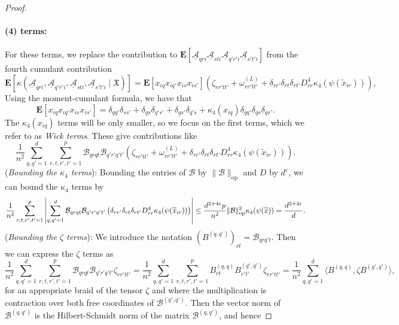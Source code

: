 \documentclass[letterpaper, 10pt, dvipsnames]{article}
\numberwithin{equation}{section}
\newcommand{\Au}{\underline{\mathcal{A}}}
\newcommand{\B}{\mathcal{B}}
\newcommand{\wt}{\widetilde}
\let\O\relax
\newcommand{\O}[1]{\mathcal{O}\left(#1\right)}
\newcommand{\Eb}{\mathbf{E}}
\theoremstyle{definition}
\begin{document}
\begin{proof}
  \paragraph{(4) terms:}  
  For these terms, we replace the contribution to $\Eb\left[
    \Au_{qri}\Au_{sti}\Au_{q'r'i}\Au_{s't'i}
    \right]$
  from the fourth cumulant contribution 
    \[
    \Eb\left[\kappa( \Au_{qri},\Au_{q'r'i},\Au_{sti},\Au_{s't'i} \mid \mathfrak{X})\right]
    = \Eb\left[x_{iq}x_{iq'}x_{is}x_{is'}\right] 
    \left( 
      \zeta_{rr'tt'} 
      + \omega^{(L)}_{rr'tt'}
      + \delta_{r r'}\delta_{r t} \delta_{r t'} D_{rr}^4 \kappa_4(\psi(\wt{x}_{ir}))
      \right),
    \]
  Using the moment-cumulant formula, we have that
  \[
  \Eb\left[ x_{iq}x_{iq'}x_{is}x_{is'} \right]
  = 
  \delta_{q q'}\delta_{s s'} + \delta_{q s}\delta_{q' s'} + \delta_{q s'}\delta_{q' s}
  + \kappa_4(x_{iq}) \delta_{q q'} \delta_{q s} \delta_{q s'}.  
  \]
  The $\kappa_4(x_{iq})$ terms will be only smaller, so we focus on the first terms, which we refer to as \emph{Wick terms}.
  These give contributions like
  \[
  \frac{1}{n^2}\sum_{q,q'=1}^d\sum_{r,t,r',t'=1}^p \B_{qrqt}\B_{q'r'q't'}
  \left( 
    \zeta_{rr'tt'} 
    +\omega^{(L)}_{rr'tt'}
  + \delta_{r r'}\delta_{r t} \delta_{r t'} D_{rr}^4 \kappa_4(\psi(\wt{x}_{ir}))
  \right). 
  \]
  \noindent (\textit{Bounding the $\kappa_4$ terms}): Bounding the entries of $\B$ by $\|\B\|_{\mathrm{op}}$ and $D$ by $d^{\varepsilon}$, we can bound the $\kappa_4$ terms by 
  \[
  \frac{1}{n^2}\sum_{r,t,r',t'=1}^p \left|\sum_{q,q'=1}^d\B_{qrqt}\B_{q'r'q't'}\left(\delta_{r r'}\delta_{r t} \delta_{r t'} D_{rr}^4 \kappa_4(\psi(\wt{x}_{ir}))\right)\right| \leq \frac{d^{2+4\varepsilon} p}{n^2}\|\B\|_{\mathrm{op}}^2 \kappa_4(\psi(\wt{x})) =  \O{\frac{d^{2+4\varepsilon}}{d}}.
  \]
  \noindent (\textit{Bounding the $\zeta$ terms}): We introduce the notation $(B^{(q,q')})_{rt} = \B_{qrq't}$.  Then we can express the $\zeta$ terms as  
  \[
    \frac{1}{n^2}\sum_{q,q'=1}^d\sum_{r,t,r',t'=1}^p \B_{qrqt}\B_{q'r'q't'} \zeta_{rr'tt'} 
    =
    \frac{1}{n^2}\sum_{q,q'=1}^d\sum_{r,t,r',t'=1}^p B^{(q,q)}_{rt}B^{(q',q')}_{r't'} \zeta_{rr'tt'} 
    = \frac{1}{n^2}
    \sum_{q,q'=1}^d
    \langle B^{(q,q)}, \zeta B^{(q',q')} \rangle,
  \]
  for an appropriate braid of the tensor $\zeta$ and where the multiplication is contraction over both free coordinates of $\B^{(q',q')}$. Then the vector norm of $\B^{(q,q')}$ is the Hilbert-Schmidt norm of the matrix $\B^{(q,q')}$, and hence

\end{proof}
\end{document}
